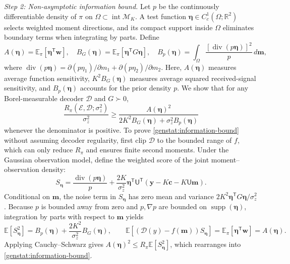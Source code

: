 \documentclass[journal,12pt,onecolumn,draftclsnofoot]{IEEEtran}
\newcommand{\enc}{\mathscr{E}}\newcommand{\dec}{\mathscr{D}}\newcommand{\R}{\mathbb R}\newcommand{\C}{\mathbb C}
\newcommand{\T}{\mathsf T}\newcommand{\suc}{\succeq}
\begin{document}
\emph{Step 2: Non-asymptotic information bound.}
Let $p$ be the continuously differentiable density of $\pi$ on $\Omega\subset\operatorname{int}\mathcal M_K$.
A test function $\boldsymbol\eta\in C_c^1(\Omega;\R^2)$ selects weighted moment directions, and its compact support inside $\Omega$ eliminates boundary terms when integrating by parts. Define
$$
 A(\boldsymbol\eta)=\mathbb E_\pi[\boldsymbol\eta^\T\boldsymbol w],\quad
 B_G(\boldsymbol\eta)=\mathbb E_\pi[\boldsymbol\eta^\T G\boldsymbol\eta],\quad
 B_p(\boldsymbol\eta)=\int_\Omega
 \frac{[\operatorname{div}(p\boldsymbol\eta)]^2}{p}\,d\boldsymbol m,
$$
where $\operatorname{div}(p\boldsymbol\eta)=\partial(p\eta_1)/\partial m_1+\partial(p\eta_2)/\partial m_2$.
Here, $A(\boldsymbol\eta)$ measures average function sensitivity, $K^2B_G(\boldsymbol\eta)$ measures average squared received-signal sensitivity, and $B_p(\boldsymbol\eta)$ accounts for the prior density $p$.
We show that for any Borel-measurable decoder $\dec$ and $G\succ0$,
\begin{equation}
 \frac{R_\pi(\enc,\dec;\sigma_z^2)}{\sigma_z^2}
 \ge\frac{A(\boldsymbol\eta)^2}
 {2K^2 B_G(\boldsymbol\eta)+\sigma_z^2B_p(\boldsymbol\eta)}
 \label{genstat:information-bound}
\end{equation}
whenever the denominator is positive.
To prove \eqref{genstat:information-bound} without assuming decoder regularity, first clip $\dec$ to the bounded range of $f$, which can only reduce $R_\pi$ and ensures finite second moments.
Under the Gaussian observation model, define the weighted score of the joint moment--observation density:
$$
 S_{\boldsymbol\eta}=
 \frac{\operatorname{div}(p\boldsymbol\eta)}p
 +\frac{2K}{\sigma_z^2}\boldsymbol\eta^\T\mathsf U^\T
 (\boldsymbol y-K\boldsymbol c-K\mathsf U\boldsymbol m).
$$
Conditional on $\boldsymbol m$, the noise term in $S_{\boldsymbol\eta}$ has zero mean and variance $2K^2\boldsymbol\eta^\T G\boldsymbol\eta/\sigma_z^2$.
Because $p$ is bounded away from zero and $p,\nabla p$ are bounded on $\operatorname{supp}(\boldsymbol\eta)$, integration by parts with respect to $\boldsymbol m$ yields
$$
 \mathbb E[S_{\boldsymbol\eta}^2]
 =B_p(\boldsymbol\eta)+\frac{2K^2}{\sigma_z^2}B_G(\boldsymbol\eta),\qquad
 \mathbb E[(\dec(y)-f(\boldsymbol m))S_{\boldsymbol\eta}]
 =\mathbb E_\pi[\boldsymbol\eta^\T\boldsymbol w]
 =A(\boldsymbol\eta).
$$
Applying Cauchy--Schwarz gives $A(\boldsymbol\eta)^2\le R_\pi\mathbb E[S_{\boldsymbol\eta}^2]$, which rearranges into \eqref{genstat:information-bound}.
\end{document}
